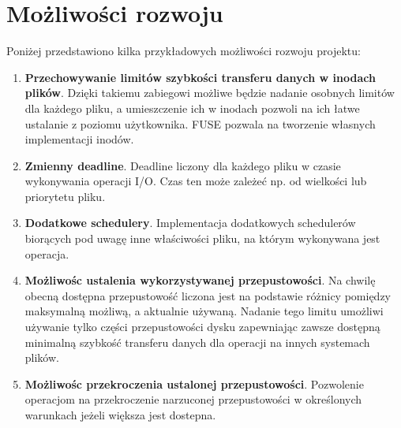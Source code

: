 \section{Możliwości rozwoju}
Poniżej przedstawiono kilka przykładowych możliwości rozwoju projektu:
\ \\
\begin{enumerate}
	\item \textbf{Przechowywanie limitów szybkości transferu danych w inodach plików}. Dzięki takiemu zabiegowi możliwe będzie 
    nadanie osobnych limitów dla każdego pliku, a umieszczenie ich w inodach pozwoli na ich łatwe
     ustalanie z poziomu użytkownika. FUSE pozwala na tworzenie własnych implementacji
    inodów.
    
    \item \textbf{Zmienny deadline}. Deadline liczony dla każdego pliku w czasie wykonywania
    operacji I/O. Czas ten może zależeć np. od wielkości lub priorytetu pliku.
    
    \item \textbf{Dodatkowe schedulery}. Implementacja dodatkowych schedulerów biorących pod uwagę
    inne właściwości pliku, na którym wykonywana jest operacja.
    
    \item \textbf{Możliwośc ustalenia wykorzystywanej przepustowości}. Na chwilę obecną dostępna przepustowość
    liczona jest na podstawie różnicy pomiędzy maksymalną możliwą, a aktualnie używaną. 
    Nadanie tego limitu umożliwi używanie tylko części przepustowości
    dysku zapewniając zawsze dostępną minimalną szybkość transferu danych dla operacji na innych systemach plików.
    
    \item \textbf{Możliwośc przekroczenia ustalonej przepustowości}. Pozwolenie
    operacjom na przekroczenie narzuconej przepustowości w określonych
    warunkach jeżeli większa jest dostepna.
\end{enumerate}